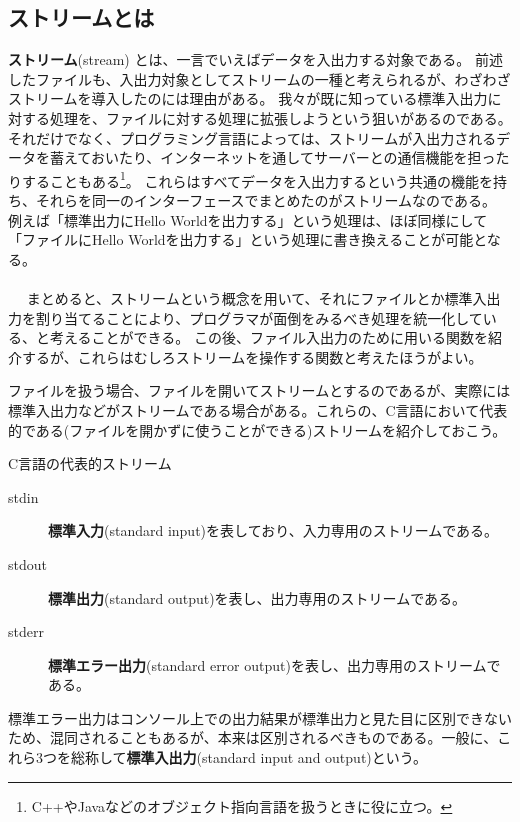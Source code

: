 \subsection{ストリームとは}
\textbf{ストリーム}(stream) とは、一言でいえばデータを入出力する対象である。
前述したファイルも、入出力対象としてストリームの一種と考えられるが、わざわざストリームを導入したのには理由がある。
我々が既に知っている標準入出力に対する処理を、ファイルに対する処理に拡張しようという狙いがあるのである。
それだけでなく、プログラミング言語によっては、ストリームが入出力されるデータを蓄えておいたり、インターネットを通してサーバーとの通信機能を担ったりすることもある\footnote{C++やJavaなどのオブジェクト指向言語を扱うときに役に立つ。}。
これらはすべてデータを入出力するという共通の機能を持ち、それらを同一のインターフェースでまとめたのがストリームなのである。
例えば「標準出力にHello Worldを出力する」という処理は、ほぼ同様にして「ファイルにHello Worldを出力する」という処理に書き換えることが可能となる。
\\ \\　
まとめると、ストリームという概念を用いて、それにファイルとか標準入出力を割り当てることにより、プログラマが面倒をみるべき処理を統一化している、と考えることができる。
この後、ファイル入出力のために用いる関数を紹介するが、これらはむしろストリームを操作する関数と考えたほうがよい。

ファイルを扱う場合、ファイルを開いてストリームとするのであるが、実際には標準入出力などがストリームである場合がある。これらの、C言語において代表的である(ファイルを開かずに使うことができる)ストリームを紹介しておこう。
\begin{itembox}[l]{C言語の代表的ストリーム}
\begin{description}
\item[stdin] \textbf{標準入力}(standard input)を表しており、入力専用のストリームである。
\item[stdout] \textbf{標準出力}(standard output)を表し、出力専用のストリームである。
\item[stderr] \textbf{標準エラー出力}(standard error output)を表し、出力専用のストリームである。
\end{description}
\end{itembox}

標準エラー出力はコンソール上での出力結果が標準出力と見た目に区別できないため、混同されることもあるが、本来は区別されるべきものである。一般に、これら3つを総称して\textbf{標準入出力}(standard input and output)という。

